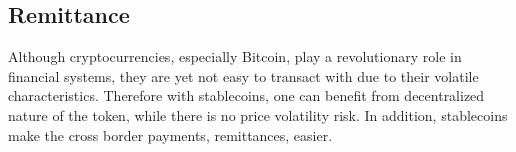 %

\subsection{Remittance}

Although cryptocurrencies, especially Bitcoin, play a revolutionary role in financial systems, they are yet not easy to transact with due to their volatile characteristics. Therefore with stablecoins, one can benefit from decentralized nature of the token, while there is no price volatility risk. In addition, stablecoins make the cross border payments, remittances, easier.


